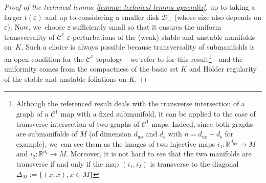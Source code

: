 \documentclass[11pt]{article}
\newcommand{\rs}{\mathrm{s}}
\newcommand{\ruo}{\mathrm{uo}}
\theoremstyle{definition}
\theoremstyle{plain}
\newcommand{\Ccal}{\mathcal{C}}
\newcommand{\D}{\mathcal{D}}
\newcommand{\R}{\mathbb{R}}
\begin{document}
\begin{appendix}
\begin{proof}[Proof of the technical lemma \ref{lemma: technical lemma appendix}]
up to taking a larger $t (\varepsilon)$ and up to considering a smaller disk $\D_-$ (whose size also depends on $\varepsilon$). Now, we~choose $\varepsilon$ sufficiently small so that it ensures the uniform transversality of $\Ccal^1$ $\varepsilon$-perturbations of the (weak) stable and unstable manifolds on~$K$. Such a choice is always possible because transversality of submanifolds is an open condition for the $\Ccal^1$ topology---we refer to \cite[\S 5.3.3, p.\,88]{laudenbach-book} for this result\footnote{Although the referenced result deals with the transverse intersection of a graph of a $\Ccal^1$ map with a fixed submanifold, it can be applied to the case of transverse intersection of two graphs of $\Ccal^1$ maps. Indeed, since both graphs are submanifolds of $M$ (of dimension $d_{\ruo}$ and $d_\rs$ with $n = d_{\ruo} + d_\rs$ for example), we~can see them as the images of two injective maps $i_1: \R^{d_{\ruo}} \to M$ and $i_2: \R^{d_\rs} \to M$. Moreover, it is not hard to see that the two manifolds are transverse if and only if the map $(i_1,i_2)$ is transverse to the diagonal $\Delta_M:= \{ (x,x), x \in M\}$}---and the uniformity comes from the compactness of the basic set $K$ and  Hölder regularity of the stable and unstable foliations on $K$.


\end{proof}
\end{appendix}
\end{document}
